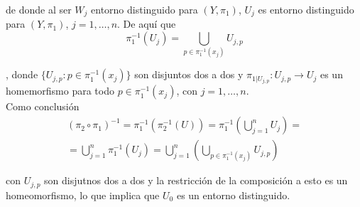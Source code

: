 \documentclass{article}
\begin{document}
de donde al ser $W_j$ entorno distinguido para $(Y,\pi_1)$, $U_j$ es entorno distinguido para $(Y,\pi_1)$, $j=1,\ldots,n$. De aquí que
\begin{equation*}
\pi_1^{-1}(U_j)=\bigcup_{p\in \pi_1^{-1}(x_j)} U_{j,p}
\end{equation*}

, donde $\{U_{j,p}: p\in \pi_1^{-1}(x_j)\}$ son disjuntos dos a dos y $\pi_{1|U_{j,p}}:U_{j,p}\rightarrow U_j$ es un homemorfismo para todo $p\in \pi_1^{-1}(x_j)$, con $j=1,\ldots,n$.\\

Como conclusión
\begin{gather*}
(\pi_2\circ \pi_1)^{-1}=\pi_1^{-1}(\pi_2^{-1}(U))=\pi_1^{-1}(\bigcup_{j=1}^n U_j)=\\
=\bigcup_{j=1}^n \pi_1^{-1}(U_j)=\bigcup_{j=1}^n(\bigcup_{p\in \pi_1^{-1}(x_j)} U_{j,p})
\end{gather*}

con $U_{j,p}$ son disjutnos dos a dos y la restricción de la composición a esto es un homeomorfismo, lo que implica que $U_0$ es un entorno distinguido.
\end{document}
